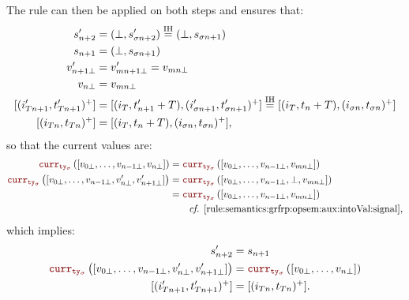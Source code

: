 \begin{skippableproof}
\begin{itemize}
              The rule  can then be applied
              on both steps and ensures that:
              \begin{align*}
                  s'_{n+2}                   & = (\bot, s'_{\sigma n+2}) \overset{\mathrm{IH}}{=} (\bot, s_{\sigma n+1})                                                               \\
                  s_{n+1}                    & = (\bot, s_{\sigma n+1})                                                                                                 \\
                  v'_{n+1\bot}               & = v'_{mn+1\bot} = v_{mn\bot}                                                                                             \\
                  v_{n\bot}                  & = v_{mn\bot}                                                                                                             \\
                  [(i'_{Tn+1}, t'_{Tn+1})^+] & = [(i_T, t'_{n+1} + T), (i'_{\sigma n+1}, t'_{\sigma n+1})^+] \overset{\mathrm{IH}}{=} [(i_T, t_n + T), (i_{\sigma n}, t_{\sigma n})^+] \\
                  [(i_{Tn}, t_{Tn})^+]       & = [(i_T, t_n + T), (i_{\sigma n}, t_{\sigma n})^+],
              \end{align*}
              so that the current values are:
              \begin{align*}
                  \CurrVal{ty_\sigma}{[v_{0\bot}, \dots, v_{n-1\bot}, v_{n\bot}]}                & = \CurrVal{ty_\sigma}{[v_{0\bot}, \dots, v_{n-1\bot}, v_{mn\bot}]}       \\
                  \CurrVal{ty_\sigma}{[v_{0\bot}, \dots, v_{n-1\bot}, v'_{n\bot}, v'_{n+1\bot}]} & = \CurrVal{ty_\sigma}{[v_{0\bot}, \dots, v_{n-1\bot}, \bot, v_{mn\bot}]} \\
                                                                                                 & = \CurrVal{ty_\sigma}{[v_{0\bot}, \dots, v_{n-1\bot}, v_{mn\bot}]}       \\
                                                                                                 & \qquad \text{\cf \Cref{rule:semantics:grfrp:opsem:aux:intoVal:signal}},
              \end{align*}
              which implies:
              \begin{align*}
                  s'_{n+2}                                                                       & = s_{n+1}                                            \\
                  \CurrVal{ty_\sigma}{[v_{0\bot}, \dots, v_{n-1\bot}, v'_{n\bot}, v'_{n+1\bot}]} & = \CurrVal{ty_\sigma}{[v_{0\bot}, \dots, v_{n\bot}]} \\
                  [(i'_{Tn+1}, t'_{Tn+1})^+]                                                     & = [(i_{Tn}, t_{Tn})^+].
              \end{align*}


\end{itemize}
\end{skippableproof}
